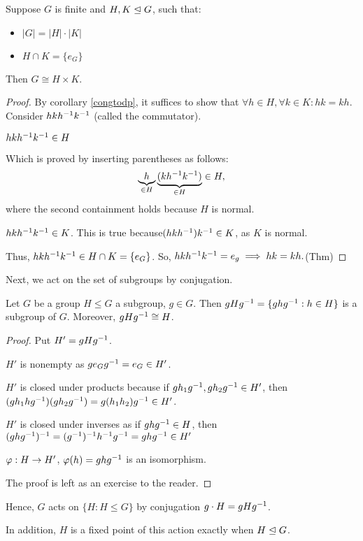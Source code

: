 \documentclass[notes.tex]{subfiles}
\begin{document}
\begin{theorem}
	Suppose $G$ is finite and $H, K\trianglelefteq G$, such that:
	\begin{itemize}
		\item $|G| = |H|\cdot|K|$
		\item $H\cap K = \{e_G\}$
	\end{itemize}
	Then $G\cong H\times K$.
\end{theorem}
\begin{proof}
	By corollary \ref{congtodp}, it suffices to show that $\forall h\in H, \forall k\in K: hk=kh$.
	Consider $hk{h}^{-1}{k}^{-1}$ (called the commutator).
	\begin{claim}[1]
		$hk{h}^{-1}{k}^{-1} \in H$
	\end{claim}
	Which is proved by inserting parentheses as follows:
	\[
		\underbrace{h}_{\in H}\underbrace{(k{h}^{-1}{k}^{-1})}_{\in H} \in H,
	\]
	where the second containment holds because $H$ is normal.

	\begin{claim}[2]
		$hk{h}^{-1}{k}^{-1} \in K$. This is true because$(hk{h}^{-1}){k}^{-1} \in K$, as $K$ is normal.
	\end{claim}
	Thus, $hk{h}^{-1}{k}^{-1} \in H\cap K = \{e_G\}$.
	So, $hk{h}^{-1}{k}^{-1} = e_g \implies hk=kh.$\qedhere(Thm)
\end{proof} 

Next, we act on the set of subgroups by conjugation.
\begin{proposition}
	Let $G$ be a group $H\le G$ a subgroup, $g\in G$. Then $gH{g}^{-1} = \{gh{g}^{-1}:h\in H\}$ is a subgroup of $G$. Moreover, $gH{g}^{-1}\cong H$.
\end{proposition}

\begin{proof}
	Put $H' = gH{g}^{-1}$.

	$H'$ is nonempty as $ge_G{g}^{-1} = e_G\in H'$.

	$H'$ is closed under products because if $gh_1{g}^{-1}, gh_2{g}^{-1} \in H'$, then $(gh_1h{g}^{-1})(gh_2{g}^{-1}) = g(h_1h_2){g}^{-1}\in H'$.

	$H'$ is closed under inverses as if $gh{g}^{-1}\in H$, then $(gh{g}^{-1})^{-1} = ({g}^{-1})^{-1}{h}^{-1}{g}^{-1} = gh{g}^{-1} \in H'$

	\begin{claim}
		$\varphi:H\to H'$, $\varphi(h) = gh{g}^{-1}$ is an isomorphism.
	\end{claim}
	The proof is left as an exercise to the reader.
\end{proof}

Hence, $G$ acts on $\{H : H\le G\}$ by conjugation $g\cdot H = gH{g}^{-1}$.

In addition, $H$ is a fixed point of this action exactly when $H\trianglelefteq G$.
\end{document}
